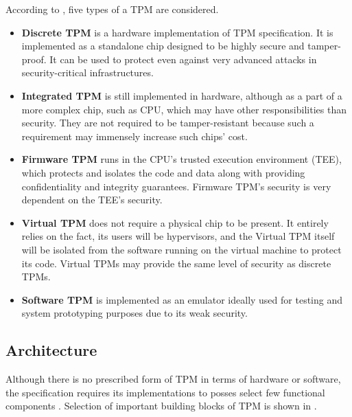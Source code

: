 According to \cite{tcg_tpm2_briefintro}, five types of a TPM are considered.

\begin{itemize}
    \item \textbf{Discrete TPM} is a hardware implementation of TPM specification. It is implemented as a standalone chip designed to be highly secure and tamper-proof. It can be used to protect even against very advanced attacks in security-critical infrastructures.
    \item \textbf{Integrated TPM} is still implemented in hardware, although as a part of a more complex chip, such as CPU, which may have other responsibilities than security. They are not required to be tamper-resistant because such a requirement may immensely increase such chips' cost.
    \item \textbf{Firmware TPM} runs in the CPU's trusted execution environment (TEE), which protects and isolates the code and data along with providing confidentiality and integrity guarantees. Firmware TPM's security is very dependent on the TEE's security.
    \item \textbf{Virtual TPM} does not require a physical chip to be present. It  entirely relies on the fact, its users will be hypervisors, and the Virtual TPM itself will be isolated from the software running on the virtual machine to protect its code. Virtual TPMs may provide the same level of security as discrete TPMs.
    \item \textbf{Software TPM} is implemented as an emulator ideally used for testing and system prototyping purposes due to its weak security.
\end{itemize}

\subsection{Architecture}
Although there is no prescribed form of TPM in terms of hardware or software, the specification requires its implementations to posses select few functional components \cite{tcg_p1_architecture}. Selection of important building blocks of TPM is shown in .

